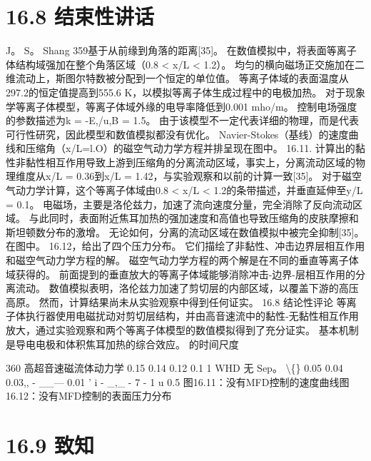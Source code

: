 \documentclass[UTF8,11pt,a4paper,openany,fontset=fandol]{ctexbook}
\begin{document}
\section{16.8 结束性讲话}
J。 S。 Shang 359基于从前缘到角落的距离[35]。 在数值模拟中，将表面等离子体结构域强加在整个角落区域（0.8 < x/L < 1.2）。 均匀的横向磁场正交施加在二维流动上，斯图尔特数被分配到一个恒定的单位值。 等离子体域的表面温度从297.2的恒定值提高到555.6 K，以模拟等离子体生成过程中的电极加热。 对于现象学等离子体模型，等离子体域外缘的电导率降低到0.001 mho/m。 控制电场强度的参数描述为k = -E,/u,B = 1.5。 由于该模型不一定代表详细的物理，而是代表可行性研究，因此模型和数值模拟都没有优化。 Navier-Stokes（基线）的速度曲线和压缩角（x/L=l.O）的磁空气动力学方程并排呈现在图中。 16.11. 计算出的黏性非黏性相互作用导致上游到压缩角的分离流动区域，事实上，分离流动区域的物理维度从x/L = 0.36到x/L = 1.42，与实验观察和以前的计算一致[35]。 对于磁空气动力学计算，这个等离子体域由0.8 < x/L < 1.2的条带描述，并垂直延伸至y/L = 0.1。 电磁场，主要是洛伦兹力，加速了流向速度分量，完全消除了反向流动区域。 与此同时，表面附近焦耳加热的强加速度和高值也导致压缩角的皮肤摩擦和斯坦顿数分布的激增。 无论如何，分离的流动区域在数值模拟中被完全抑制[35]。 在图中。 16.12，给出了四个压力分布。 它们描绘了非黏性、冲击边界层相互作用和磁空气动力学方程的解。 磁空气动力学方程的两个解是在不同的垂直等离子体域获得的。 前面提到的垂直放大的等离子体域能够消除冲击-边界-层相互作用的分离流动。 数值模拟表明，洛伦兹力加速了剪切层的内部区域，以覆盖下游的高压高原。 然而，计算结果尚未从实验观察中得到任何证实。 16.8 结论性评论 等离子体执行器使用电磁扰动对剪切层结构，并由高音速流中的黏性-无黏性相互作用放大，通过实验观察和两个等离子体模型的数值模拟得到了充分证实。 基本机制是导电电极和体积焦耳加热的综合效应。 的时间尺度

360 高超音速磁流体动力学 0.15 0.14 0.12 0.1 1 WHD 无 Sep。 \textbackslash\{\} 0.05 0.04 0.03,, - \_\_--- 0.01 ' i - \_,\_ - 7 - 1 u 0.5 图16.11：没有MFD控制的速度曲线图16.12：没有MFD控制的表面压力分布

\section{16.9 致知}
\end{document}
